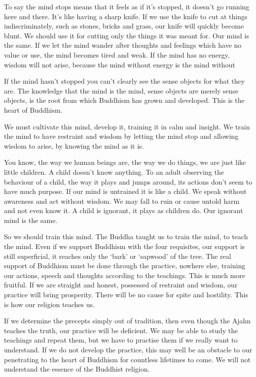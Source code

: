 To say the mind stops means that it feels as if it's stopped, it doesn't go running here and there. It's like having a sharp knife. If we use the knife to cut at things indiscriminately, such as stones, bricks and grass, our knife will quickly become blunt. We should use it for cutting only the things it was meant for. Our mind is the same. If we let the mind wander after thoughts and feelings which have no value or use, the mind becomes tired and weak. If the mind has no energy, wisdom will not arise, because the mind without energy is the mind without 

If the mind hasn't stopped you can't clearly see the sense objects for what they are. The knowledge that the mind is the mind, sense objects are merely sense objects, is the root from which Buddhism has grown and developed. This is the heart of Buddhism.

We must cultivate this mind, develop it, training it in calm and insight. We train the mind to have restraint and wisdom by letting the mind stop and allowing wisdom to arise, by knowing the mind as it is.

You know, the way we human beings are, the way we do things, we are just like little children. A child doesn't know anything. To an adult observing the behaviour of a child, the way it plays and jumps around, its actions don't seem to have much purpose. If our mind is untrained it is like a child. We speak without awareness and act without wisdom. We may fall to ruin or cause untold harm and not even know it. A child is ignorant, it plays as children do. Our ignorant mind is the same.

So we should train this mind. The Buddha taught us to train the mind, to teach the mind. Even if we support Buddhism with the four requisites, our support is still superficial, it reaches only the `bark' or `sapwood' of the tree. The real support of Buddhism must be done through the practice, nowhere else, training our actions, speech and thoughts according to the teachings. This is much more fruitful. If we are straight and honest, possessed of restraint and wisdom, our practice will bring prosperity. There will be no cause for spite and hostility. This is how our religion teaches us.

If we determine the precepts simply out of tradition, then even though the Ajahn teaches the truth, our practice will be deficient. We may be able to study the teachings and repeat them, but we have to practise them if we really want to understand. If we do not develop the practice, this may well be an obstacle to our penetrating to the heart of Buddhism for countless lifetimes to come. We will not understand the essence of the Buddhist religion.

